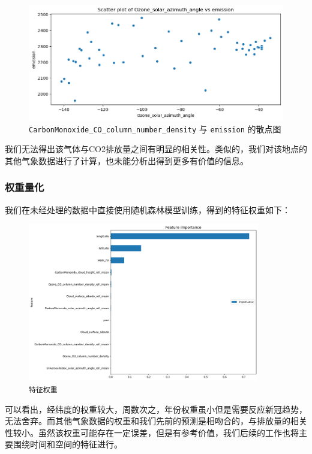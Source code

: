 \documentclass{ctexart}
\begin{document}
\begin{figure}[H]
      \centering
      \includegraphics[width=1\textwidth]{output7.png}
      \caption{\label{fig:7}\texttt{CarbonMonoxide\_CO\_column\_number\_density} 与 \texttt{emission} 的散点图}
\end{figure}

我们无法得出该气体与CO2排放量之间有明显的相关性。类似的，我们对该地点的其他气象数据进行了计算，也未能分析出得到更多有价值的信息。

\subsubsection{权重量化}

我们在未经处理的数据中直接使用随机森林模型训练，得到的特征权重如下：

\begin{figure}[H]
      \centering
      \includegraphics[width=0.9\textwidth]{output11.png}
      \caption{\label{fig:11}\texttt{特征权重}}
\end{figure}

可以看出，经纬度的权重较大，周数次之，年份权重虽小但是需要反应新冠趋势，无法舍弃。而其他气象数据的权重和我们先前的预测是相吻合的，与排放量的相关性较小。虽然该权重可能存在一定误差，但是有参考价值，我们后续的工作也将主要围绕时间和空间的特征进行。
\end{document}

